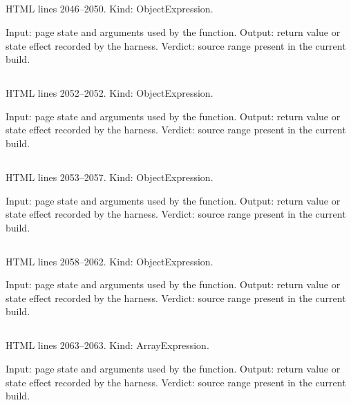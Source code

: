 \subsection*{\texttt{}}
\label{vf_10_REP_REGEX}
HTML lines 2046--2050. Kind: ObjectExpression.

Input: page state and arguments used by the function.
Output: return value or state effect recorded by the harness.
Verdict: source range present in the current build.

\subsection*{\texttt{}}
\label{vf_11_CALL}
HTML lines 2052--2052. Kind: ObjectExpression.

Input: page state and arguments used by the function.
Output: return value or state effect recorded by the harness.
Verdict: source range present in the current build.

\subsection*{\texttt{}}
\label{vf_12_SAMPLE_TYPE}
HTML lines 2053--2057. Kind: ObjectExpression.

Input: page state and arguments used by the function.
Output: return value or state effect recorded by the harness.
Verdict: source range present in the current build.

\subsection*{\texttt{}}
\label{vf_13_TYPE_TO_ROLE}
HTML lines 2058--2062. Kind: ObjectExpression.

Input: page state and arguments used by the function.
Output: return value or state effect recorded by the harness.
Verdict: source range present in the current build.

\subsection*{\texttt{}}
\label{vf_14_NEGATIVE_FAMILY}
HTML lines 2063--2063. Kind: ArrayExpression.

Input: page state and arguments used by the function.
Output: return value or state effect recorded by the harness.
Verdict: source range present in the current build.

